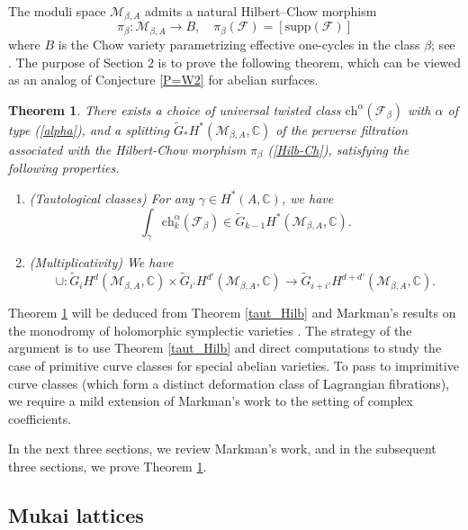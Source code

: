 \documentclass[11pt]{amsart}
\theoremstyle{plain}
\newtheorem{thm}{Theorem}[section]
\theoremstyle{definition}
\theoremstyle{remark}
\newcommand{\BC}{{\mathbb{C}}}
\newcommand{\CF}{{\mathcal F}}
\newcommand{\CM}{{\mathcal M}}
\begin{document}
The moduli space $\CM_{\beta,A}$ admits a natural Hilbert--Chow morphism
\begin{equation}\label{Hilb-Ch}
\pi_\beta: \CM_{\beta,A} \to B, \quad \pi_\beta(\CF) = [\mathrm{supp}(\CF)]
\end{equation}
where $B$ is  the Chow variety parametrizing effective one-cycles in the class $\beta$; see \cite{LP1, LP2}. The purpose of Section 2 is to prove the following theorem, which can be viewed as an analog of Conjecture \ref{P=W2} for abelian surfaces.

\begin{thm}\label{taut_abelian}
There exists a choice of universal twisted class
$\mathrm{ch}^\alpha(\CF_\beta)$ with $\alpha$ of  type (\ref{alpha}),
and a splitting $\widetilde{G}_\ast H^\ast(\CM_{\beta,A}, \BC)$ of the perverse filtration associated with
the Hilbert-Chow morphism $\pi_\beta$ (\ref{Hilb-Ch}), satisfying the following properties.
\begin{enumerate}
    \item[(a)](Tautological classes) For any $\gamma \in H^*(A, \BC)$, we have
    \[
   \int_\gamma \mathrm{ch}^\alpha_k(\CF_\beta) \in \widetilde{G}_{k-1}H^*(\CM_{\beta,A}, \BC).
    \]
    \item[(b)](Multiplicativity) We have
    \[
   \cup: \widetilde{G}_i H^d(\CM_{\beta,A}, \BC) \times \widetilde{G}_{i'} H^{d'}(\CM_{\beta,A}, \BC) \to \widetilde{G}_{i+i'}H^{d+d'}(\CM_{\beta,A}, \BC).
    \]
\end{enumerate}
\end{thm}



Theorem \ref{taut_abelian} will be deduced from Theorem \ref{taut_Hilb}  and  Markman's results on the monodromy of holomorphic symplectic varieties
\cite{Markman2, Markman3}.
The strategy of the argument is to use Theorem \ref{taut_Hilb} and direct computations to study the case of primitive curve classes for special abelian varieties. To pass to imprimitive curve classes (which form a distinct deformation class of Lagrangian fibrations), we require a mild extension of Markman's work to the setting of complex coefficients.

In the next three sections, we review Markman's work, and in the subsequent three sections, we  prove 
Theorem \ref{taut_abelian}.




\subsection{Mukai lattices} 
\end{document}
